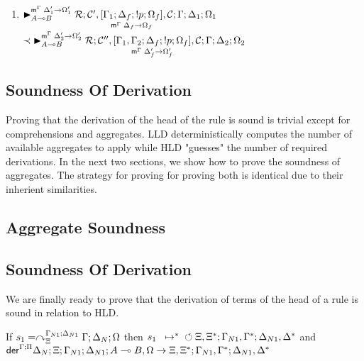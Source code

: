 \begin{enumerate}[leftmargin=*]
   \item $\matstate{A \lolli B}{\rulestk}{\lstack{C'},
      \pframe{\Gamma_1}{\Delta_f}{\bang p}{\Omega_f}{\Delta_f}{\Omega_f},
   \lstack{C}}{\Gamma}{\Delta_1}{\Omega_1}{\Delta'_1 \rightarrow \Omega'_1}$\\
   \hspace*{1cm} $\prec \matstate{A \lolli B}{\rulestk}{\lstack{C''},
      \pframe{\Gamma_1, \Gamma_2}{\Delta_f}{\bang p}{\Omega_f}{\Delta'_f}{\Omega'_f},
      \lstack{C}}{\Gamma}{\Delta_2}{\Omega_2}{\Delta'_2 \rightarrow \Omega'_2}$

\end{enumerate}

\subsection{Soundness Of Derivation}

Proving that the derivation of the head of the rule is sound is trivial except
for comprehensions and aggregates. LLD deterministically computes the number of
available aggregates to apply while HLD "guesses" the number of required
derivations.  In the next two sections, we show how to prove the soundness of
aggregates. The strategy for proving for proving both is identical due to their
inherient similarities.

\subsection{Aggregate Soundness}



\subsection{Soundness Of Derivation}

We are finally ready to prove that the derivation of terms of the head of a rule
is sound in relation to HLD.

\begin{lemma}\label{thm:head_derivation_soundness}
If $s_1 = \derstatex{\Gamma}{\Delta_N}{\Xi}{\Gamma_{N1}}{\Delta_{N1}}{\Omega}$
then $\transs{s_1}{\finalstate{\Xi, \Xi^{*}}{\Gamma_{N1},
      \Gamma^{*}}{\Delta_{N1}, \Delta^{*}}}$ and
$\dz{\Gamma}{\Pi}{\Delta_N}{\Xi}{\Gamma_{N1}}{\Delta_{N1}}{A \lolli B,
   \Omega}{\Xi, \Xi^{*}; \Gamma_{N1}, \Gamma^{*}; \Delta_{N1}, \Delta^{*}}$
\end{lemma}

